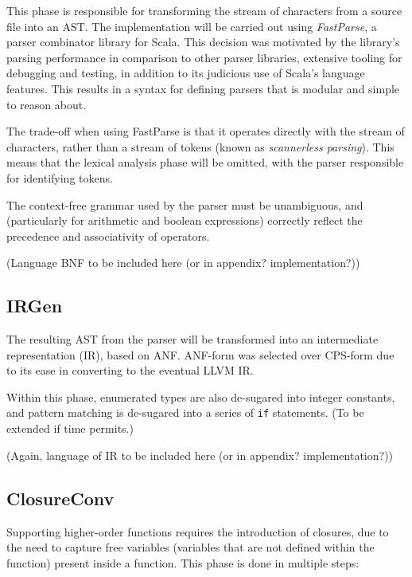 This phase is responsible for transforming the stream of characters from a source file into an AST.
The implementation will be carried out using \emph{FastParse}, a parser combinator library for
Scala. This decision was motivated by the library's parsing performance in comparison to other
parser libraries, extensive tooling for debugging and testing, in addition to its judicious use of
Scala's language features. This results in a syntax for defining parsers that is modular and simple
to reason about.

The trade-off when using FastParse is that it operates directly with the stream of characters,
rather than a stream of tokens (known as \emph{scannerless parsing}). This means that the lexical
analysis phase will be omitted, with the parser responsible for identifying tokens.

The context-free grammar used by the parser must be unambiguous, and
(particularly for arithmetic and boolean expressions) correctly reflect the precedence and
associativity of operators.


(Language BNF to be included here (or in appendix? implementation?))

\subsection{IRGen}

The resulting AST from the parser will be transformed into an intermediate representation (IR),
based on ANF. ANF-form was selected over CPS-form due to its ease in converting to the eventual LLVM
IR.

Within this phase, enumerated types are also de-sugared into integer constants, and pattern matching
is de-sugared into a series of \texttt{if} statements. (To be extended if time permits.)

(Again, language of IR to be included here (or in appendix? implementation?))


\subsection{ClosureConv}

Supporting higher-order functions requires the introduction of closures, due to the need to capture
free variables (variables that are not defined within the function) present inside a function. This
phase is done in multiple steps:


